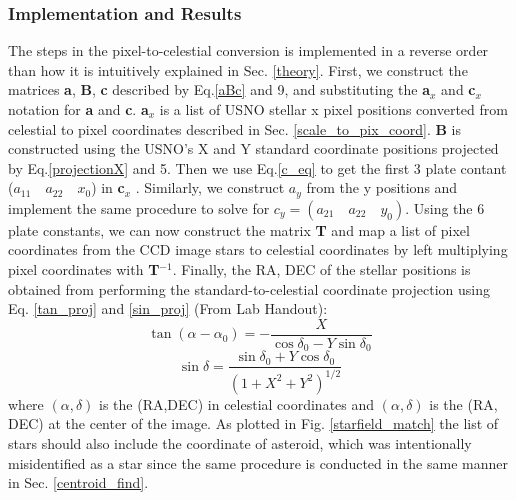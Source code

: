 \documentclass[authoryear, 12pt,5p, times]{elsarticle}
\begin{document}
	\subsubsection{Implementation and Results}
	The steps in the pixel-to-celestial conversion is implemented in a reverse order than how it is intuitively explained in Sec. \ref{theory}. First, we construct the matrices \textbf{a}, \textbf{B}, \textbf{c} described by Eq.\ref{aBc} and 9, and substituting the \textbf{a}$_x$ and \textbf{c}$_x$ notation for \textbf{a} and \textbf{c}. \textbf{a}$_x$ is a list of USNO stellar x pixel positions converted from celestial to pixel coordinates described in Sec. \ref{scale_to_pix_coord}.  \textbf{B} is constructed using the USNO's X and Y standard coordinate positions projected by Eq.\ref{projectionX} and 5. Then we use Eq.\ref{c_eq}
to get the first 3 plate contant ($a_{11}\quad a_{22}\quad x_0$) in \textbf{c}$_x$	. Similarly, we construct $a_y$ from the y positions and implement the same procedure to solve for $c_y=(a_{21} \quad a_{22}\quad y_0)$.
Using the 6 plate constants, we can now construct the matrix \textbf{T} and map a list of pixel coordinates from the CCD image stars to celestial coordinates by left multiplying pixel coordinates with \textbf{T}$^{-1}$. Finally, the RA, DEC of the stellar positions is obtained from performing the standard-to-celestial coordinate projection using Eq. \ref{tan_proj} and \ref{sin_proj} (From Lab Handout):
\begin{equation}
\tan(\alpha-\alpha_0)=-\frac{X}{\cos\delta_0-Y\sin\delta_0}
\label{tan_proj}
\end{equation}
\begin{equation}
\sin \delta= \frac{\sin \delta_0+Y\cos\delta_0}{(1+X^2+Y^2)^{1/2}}
\label{sin_proj}
\end{equation}
where $(\alpha,\delta)$ is the (RA,DEC) in celestial coordinates and $(\alpha,\delta)$ is the (RA, DEC) at the center of the image.
 As plotted in Fig. \ref{starfield_match} the list of stars should also include the coordinate of asteroid, which was intentionally misidentified as a star since the same procedure is conducted in the same manner in Sec. \ref{centroid_find}. 
\end{document}
